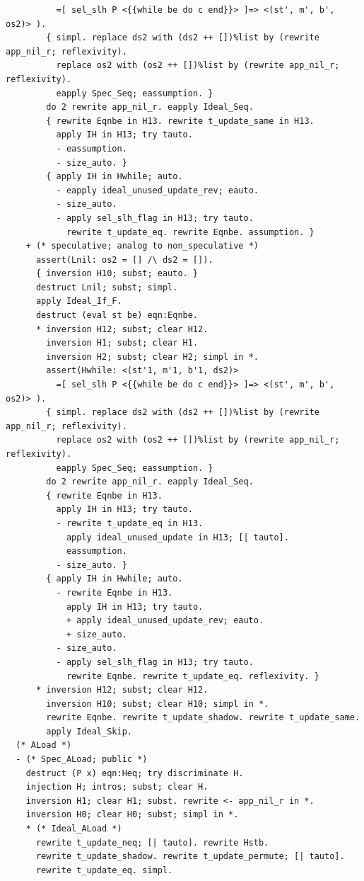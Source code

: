 \documentclass[12pt]{report}
\begin{document}
\begin{verbatim}
          =[ sel_slh P <{{while be do c end}}> ]=> <(st', m', b', os2)> ).
        { simpl. replace ds2 with (ds2 ++ [])%list by (rewrite app_nil_r; reflexivity).
          replace os2 with (os2 ++ [])%list by (rewrite app_nil_r; reflexivity).
          eapply Spec_Seq; eassumption. }
        do 2 rewrite app_nil_r. eapply Ideal_Seq.
        { rewrite Eqnbe in H13. rewrite t_update_same in H13.
          apply IH in H13; try tauto.
          - eassumption.
          - size_auto. }
        { apply IH in Hwhile; auto.
          - eapply ideal_unused_update_rev; eauto.
          - size_auto.
          - apply sel_slh_flag in H13; try tauto.
            rewrite t_update_eq. rewrite Eqnbe. assumption. }
    + (* speculative; analog to non_speculative *)
      assert(Lnil: os2 = [] /\ ds2 = []).
      { inversion H10; subst; eauto. }
      destruct Lnil; subst; simpl.
      apply Ideal_If_F.
      destruct (eval st be) eqn:Eqnbe.
      * inversion H12; subst; clear H12.
        inversion H1; subst; clear H1.
        inversion H2; subst; clear H2; simpl in *.
        assert(Hwhile: <(st'1, m'1, b'1, ds2)>
          =[ sel_slh P <{{while be do c end}}> ]=> <(st', m', b', os2)> ).
        { simpl. replace ds2 with (ds2 ++ [])%list by (rewrite app_nil_r; reflexivity).
          replace os2 with (os2 ++ [])%list by (rewrite app_nil_r; reflexivity).
          eapply Spec_Seq; eassumption. }
        do 2 rewrite app_nil_r. eapply Ideal_Seq.
        { rewrite Eqnbe in H13.
          apply IH in H13; try tauto.
          - rewrite t_update_eq in H13.
            apply ideal_unused_update in H13; [| tauto].
            eassumption.
          - size_auto. }
        { apply IH in Hwhile; auto.
          - rewrite Eqnbe in H13.
            apply IH in H13; try tauto.
            + apply ideal_unused_update_rev; eauto.
            + size_auto.
          - size_auto.
          - apply sel_slh_flag in H13; try tauto.
            rewrite Eqnbe. rewrite t_update_eq. reflexivity. }
      * inversion H12; subst; clear H12.
        inversion H10; subst; clear H10; simpl in *.
        rewrite Eqnbe. rewrite t_update_shadow. rewrite t_update_same.
        apply Ideal_Skip.
  (* ALoad *)
  - (* Spec_ALoad; public *)
    destruct (P x) eqn:Heq; try discriminate H.
    injection H; intros; subst; clear H.
    inversion H1; clear H1; subst. rewrite <- app_nil_r in *.
    inversion H0; clear H0; subst; simpl in *.
    * (* Ideal_ALoad *)
      rewrite t_update_neq; [| tauto]. rewrite Hstb.
      rewrite t_update_shadow. rewrite t_update_permute; [| tauto].
      rewrite t_update_eq. simpl.

\end{verbatim}
\end{document}
